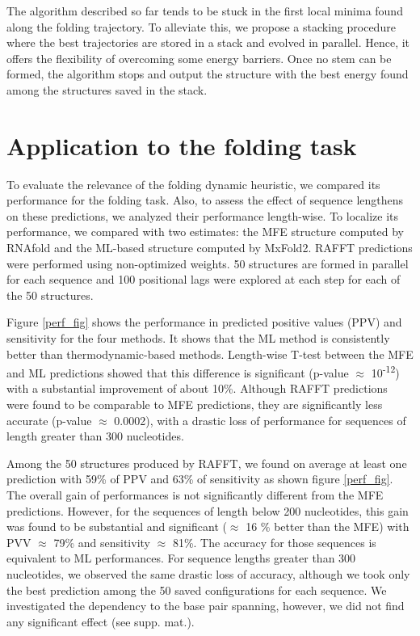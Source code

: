 \documentclass[a4paper,12pt]{article}
\begin{document}
{{The algorithm described so far tends to be stuck in the first local minima found
along the folding trajectory. To alleviate this, we propose a stacking procedure
where the best trajectories are stored in a stack and evolved in parallel.
Hence, it offers the flexibility of overcoming some energy barriers. Once no
stem can be formed, the algorithm stops and output the structure with the best
energy found among the structures saved in the stack.

\section{Application to the folding task}
\label{sec:orgd6fb94a}
To evaluate the relevance of the folding dynamic heuristic, we compared its
performance for the folding task. Also, to assess the effect of sequence
lengthens on these predictions, we analyzed their performance length-wise. To
localize its performance, we compared with two estimates: the MFE structure
computed by RNAfold and the ML-based structure computed by MxFold2. RAFFT
predictions were performed using non-optimized weights. 50 structures are formed
in parallel for each sequence and 100 positional lags were explored at each step
for each of the 50 structures.

Figure \ref{perf_fig} shows the performance in predicted positive values (PPV) and
sensitivity for the four methods. It shows that the ML method is consistently
better than thermodynamic-based methods. Length-wise T-test between the MFE and
ML predictions showed that this difference is significant (p-value \(\approx\)
10\textsuperscript{-12}) with a substantial improvement of about 10\%. Although RAFFT
predictions were found to be comparable to MFE predictions, they are
significantly less accurate (p-value \(\approx\) 0.0002), with a drastic loss of
performance for sequences of length greater than 300 nucleotides.

Among the 50 structures produced by RAFFT, we found on average at least one
prediction with 59\% of PPV and 63\% of sensitivity as shown figure \ref{perf_fig}.
The overall gain of performances is not significantly different from the MFE
predictions. However, for the sequences of length below 200 nucleotides, this
gain was found to be substantial and significant (\(\approx\) 16 \% better than the
MFE) with PVV \(\approx\) 79\% and sensitivity \(\approx\) 81\%. The accuracy for those
sequences is equivalent to ML performances. For sequence lengths greater than
300 nucleotides, we observed the same drastic loss of accuracy, although we took
only the best prediction among the 50 saved configurations for each sequence. We
investigated the dependency to the base pair spanning, however, we did not find
any significant effect (see supp. mat.).

}}
\end{document}

